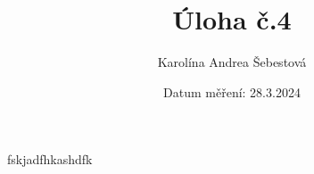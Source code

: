 \documentclass[a4paper, czech]{article}
\title{Úloha č.4}
\author{Karolína Andrea Šebestová}
\date{Datum měření: 28.3.2024}
\begin{document}
\maketitle

fskjadfhkashdfk
\end{document}
